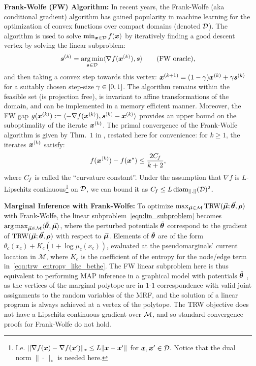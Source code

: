 {\bf Frank-Wolfe (FW) Algorithm:} 
In recent years, the Frank-Wolfe (aka conditional gradient) algorithm has gained 
popularity in machine learning \citep{jaggi2013revisiting} for the 
optimization of convex functions over compact domains (denoted $\mathcal{D}$). The algorithm is used to 
solve 
$\min_{\bm{x}\in \mathcal{D}} f(\bm{x})$	
by iteratively finding a good descent vertex by solving the linear subproblem:
%
\begin{equation}
\label{eqn:lin_subproblem}
\bm{s}^{(k)} = \operatorname*{\arg\min}_{\bm{s}\in\mathcal{D}}\langle\nabla f(\bm{x}^{(k)}), \bm{s}\rangle \qquad \text{(FW oracle)},
\end{equation}
%
and then taking a convex step towards this vertex: $\bm{x}^{(k+1)} = (1-\gamma) \bm{x}^{(k)} + \gamma \bm{s}^{(k)}$ for
a suitably chosen step-size $\gamma \in [0,1]$.
The algorithm remains within the feasible set (is projection free), is invariant to affine transformations of the domain, and can be implemented in a memory efficient manner. Moreover, the FW gap $g(\bm{x}^{(k)}) := \langle-\nabla f(\bm{x}^{(k)}), \bm{s}^{(k)} - \bm{x}^{(k)}\rangle$ provides an upper bound on the suboptimality of the iterate $\bm{x}^{(k)}$.
%
%
%
The primal convergence of the Frank-Wolfe algorithm is given by 
Thm.~$1$ in \citet{jaggi2013revisiting}, restated here for convenience: for $k\geq1$, the iterates $\bm{x}^{(k)}$ satisfy:
\vspace{-3mm}
\begin{dmath}
	\label{eqn:fw_theorem_convergence_original}
f(\xk) - f(\xopt) \leq \frac{2\Cf}{k+2} ,
\end{dmath}
\vspace{-3mm}
where $C_{\hspace{-0.08em}f}$ is called the ``curvature constant''. Under the assumption 
that $\nabla f$ is $L$-Lipschitz continuous\footnote{I.e. $\|\nabla{f}(\bm{x})-\nabla{f}(\bm{x}')\|_* \leq L \|\bm{x}-\bm{x}'\|$ for $\bm{x}, \bm{x}' \in \mathcal{D}$. Notice that the dual norm $\| \cdot \|_*$ is needed here.} on $\mathcal{D}$, we can bound it as
$C_{\hspace{-0.08em}f} \leq L \operatorname{diam}_{||.||}(\mathcal{D})^2$.
%
%
%
%
%
%
%
%
%

\textbf{Marginal Inference with Frank-Wolfe:}
To optimize $\max_{\vec{\bm{\mu}}\in\mathcal{M}} \text{TRW}(\vec{\bm{\mu}};\vec{\bm{\theta}},\bm{\rho})$ with Frank-Wolfe,
the linear subproblem~\eqref{eqn:lin_subproblem} becomes $\operatorname*{\arg\max}_{\vec{\bm{\mu}}\in\mathcal{M}}\langle\tilde{\bm{\theta}},\vec{\bm{\mu}}\rangle$, where the perturbed potentials $\tilde{\bm{\theta}}$ 
correspond to the gradient of $\text{TRW}(\vec{\bm{\mu}};\vec{\bm{\theta}},\bm{\rho})$ with respect to $\vec{\bm{\mu}}$. %
Elements of $\tilde{\bm{\theta}}$ are of the 
form $\theta_c(x_c) + K_c (1+\log\mu_c(x_c))$, evaluated at the pseudomarginals'
current location in $\mathcal{M}$, where 
$K_c$ is the coefficient of the entropy for the node/edge
term in~\eqref{eqn:trw_entropy_like_bethe}.
The FW linear subproblem here is thus equivalent to performing MAP inference in a graphical model with
potentials $\tilde{\bm{\theta}}$ \citep{belangerWorkshop2013}, as
the vertices of the marginal polytope are in 1-1 
correspondence with valid joint assignments to the random variables of the MRF,
and the solution of a linear program is always achieved at a
vertex of the polytope. 
%
%
The TRW objective does not have a Lipschitz continuous gradient over $\mathcal{M}$, and so standard convergence proofs for Frank-Wolfe do not hold.
%
